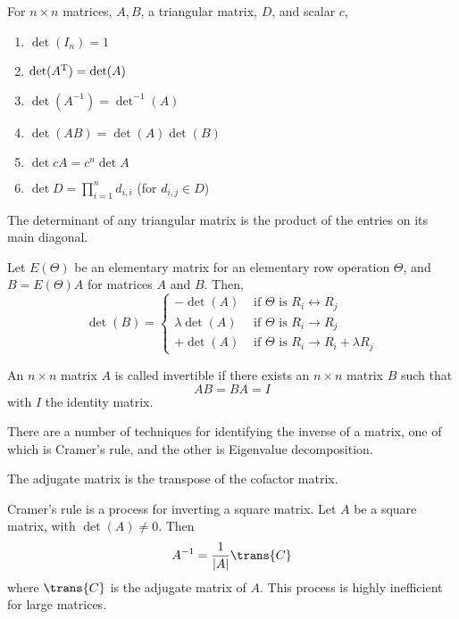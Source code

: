 \begin{theorem}
  For $n \times n$ matrices, $A,B$, a triangular matrix, $D$, and
  scalar $c$,
  \begin{enumerate}
  \item $\det(I_n) = 1$
  \item $\det(A^{\rm T}) = \det(A)$
  \item $\det(A^{-1}) = \det^{-1}(A)$
  \item $\det(AB) = \det(A) \det(B)$
  \item $\det{cA} = c^n \det{A}$
  \item $\det{D} = \prod_{i=1}^n d_{i,i}$ (for $d_{i,j} \in D$)
  \end{enumerate}
\end{theorem}

\begin{lemma}
  The determinant of any triangular matrix is the product of the
  entries on its main diagonal.
\end{lemma}

\begin{lemma}
  Let $E(\Theta)$ be an elementary matrix for an elementary row
  operation $\Theta$, and $B = E(\Theta)A$ for matrices $A$ and $B$. Then,
  \[ \det(B) = 
  \begin{cases}
    - \det(A) & \text{ if } \Theta \text{ is } R_i \leftrightarrow R_j \\
    \lambda \det(A) & \text{ if } \Theta \text { is } R_i \to R_j \\
    + \det(A) & \text{ if } \Theta \text{ is } R_i \to R_i + \lambda R_j
  \end{cases}
\]
\end{lemma}

\begin{definition}
  An $n \times n$ matrix $A$ is called invertible if there exists an
  $n \times n$ matrix $B$ such that
  \[ AB = BA = I \]
  with $I$ the identity matrix.
\end{definition}
There are a number of techniques for identifying the inverse of a
matrix, one of which is Cramer's rule, and the other is Eigenvalue
decomposition.

\begin{definition}
  The adjugate matrix is the transpose of the cofactor matrix.
\end{definition}

\begin{algorithm}
  Cramer's rule is a process for inverting a square matrix.  Let $A$
  be a square matrix, with $\det(A) \neq 0$. Then 
  \[A^{-1} = \frac{1}{|A|} \trans{C} \] where $\trans{C}$ is the
  adjugate matrix of $A$. This process is highly inefficient for large
  matrices.
\end{algorithm}

